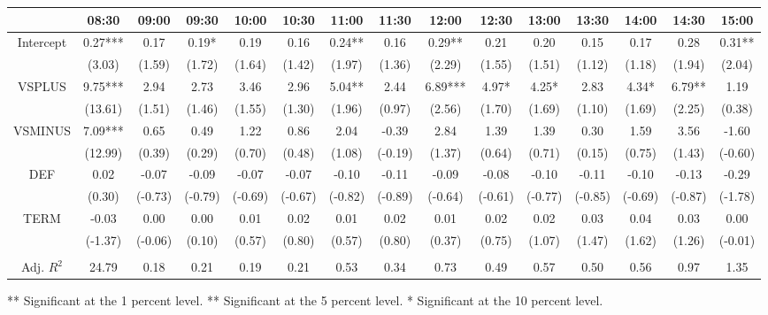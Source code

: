 \begin{table}[h]
\begin{threeparttable}
\begin{tabular}{ccccccccccccccc}
          & 08:30   & 09:00   & 09:30   & 10:00   & 10:30   & 11:00   & 11:30   & 12:00   & 12:30   & 13:00   & 13:30   & 14:00   & 14:30   & 15:00   \\ \midrule
Intercept & 0.27*** & 0.17    & 0.19*   & 0.19    & 0.16    & 0.24**  & 0.16    & 0.29**  & 0.21    & 0.20    & 0.15    & 0.17    & 0.28    & 0.31**  \\
          & (3.03)  & (1.59)  & (1.72)  & (1.64)  & (1.42)  & (1.97)  & (1.36)  & (2.29)  & (1.55)  & (1.51)  & (1.12)  & (1.18)  & (1.94)  & (2.04)  \\
VSPLUS    & 9.75*** & 2.94    & 2.73    & 3.46    & 2.96    & 5.04**  & 2.44    & 6.89*** & 4.97*   & 4.25*   & 2.83    & 4.34*   & 6.79**  & 1.19    \\
          & (13.61) & (1.51)  & (1.46)  & (1.55)  & (1.30)  & (1.96)  & (0.97)  & (2.56)  & (1.70)  & (1.69)  & (1.10)  & (1.69)  & (2.25)  & (0.38)  \\
VSMINUS   & 7.09*** & 0.65    & 0.49    & 1.22    & 0.86    & 2.04    & -0.39   & 2.84    & 1.39    & 1.39    & 0.30    & 1.59    & 3.56    & -1.60   \\
          & (12.99) & (0.39)  & (0.29)  & (0.70)  & (0.48)  & (1.08)  & (-0.19) & (1.37)  & (0.64)  & (0.71)  & (0.15)  & (0.75)  & (1.43)  & (-0.60) \\
DEF       & 0.02    & -0.07   & -0.09   & -0.07   & -0.07   & -0.10   & -0.11   & -0.09   & -0.08   & -0.10   & -0.11   & -0.10   & -0.13   & -0.29   \\
          & (0.30)  & (-0.73) & (-0.79) & (-0.69) & (-0.67) & (-0.82) & (-0.89) & (-0.64) & (-0.61) & (-0.77) & (-0.85) & (-0.69) & (-0.87) & (-1.78) \\
TERM      & -0.03   & 0.00    & 0.00    & 0.01    & 0.02    & 0.01    & 0.02    & 0.01    & 0.02    & 0.02    & 0.03    & 0.04    & 0.03    & 0.00    \\
          & (-1.37) & (-0.06) & (0.10)  & (0.57)  & (0.80)  & (0.57)  & (0.80)  & (0.37)  & (0.75)  & (1.07)  & (1.47)  & (1.62)  & (1.26)  & (-0.01) \\
          &         &         &         &         &         &         &         &         &         &         &         &         &         &         \\
Adj. $R^{2}$    & 24.79   & 0.18    & 0.21    & 0.19    & 0.21    & 0.53    & 0.34    & 0.73    & 0.49    & 0.57    & 0.50    & 0.56    & 0.97    & 1.35     \\

\bottomrule
\end{tabular}

\begin{tablenotes}
\item *** Significant at the 1 percent level.    
** Significant at the 5 percent level.   
* Significant at the 10 percent level.
\end{tablenotes}


\end{threeparttable}

\end{table}